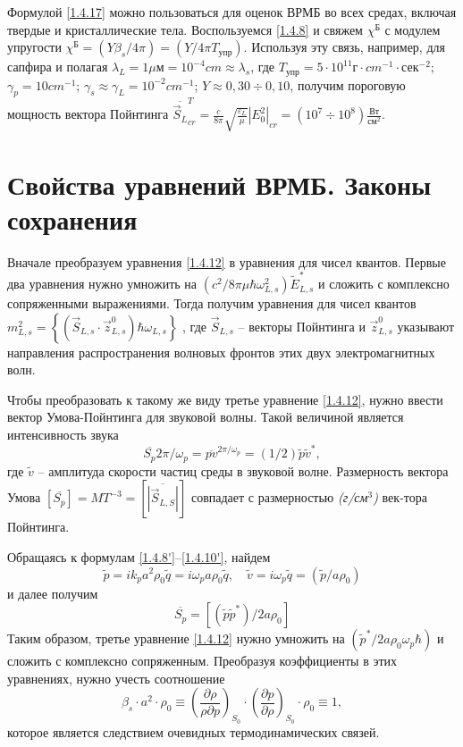 \documentclass[a4paper]{article}
\begin{document}
Формулой \eqref{1.4.17} можно пользоваться для оценок ВРМБ во всех средах, включая твердые и кристаллические тела. Воспользуемся \eqref{1.4.8} и свяжем $\chi^{\text{Б}}$ с модулем упругости $\chi^{\text{Б}}=(Y\beta_{s}/4\pi)=(Y/4\pi T_{\text{упр}})$. Используя эту связь, например, для сапфира и полагая $\lambda_{L}=1\mu\text{м}=10^{-4}cm\approx\lambda_{s}$, где $T_{\text{упр}}=5\cdot10^{11}\text{г}\cdot cm^{-1}\cdot\text{сек}^{-2}$;$\gamma_{p}=10cm^{-1}$; $\gamma_{s}\approx\gamma_{L}=10^{-2}cm^{-1}$; $Y\approx0,30\div0,10$, получим пороговую мощность вектора Пойнтинга $\overline{\vec{S}_{L}}^{T}_{cr}=\frac{c}{8\pi}\sqrt{\frac{\varepsilon_{L}}{\mu}}\left|E_{0}^{2}\right|_{cr}=(10^{7}\div10^{8})\frac{\text{Вт}}{\text{см}^{2}}$. 
\section{Свойства уравнений ВРМБ. Законы сохранения }

Вначале преобразуем уравнения \eqref{1.4.12} в уравнения для чисел квантов. Первые два уравнения нужно умножить на $(c^{2}/8\pi\mu\hbar\omega_{L,s}^{2})\tilde{E}_{L,s}^{*}$ и сложить с комплексно сопряженными выражениями. Тогда получим уравнения для чисел квантов $m_{L,s}^{2}=\left\{\left(\vec{S}_{L,s}\cdot\vec{z}_{L,s}^{0}\right)\hbar\omega_{L,s}\right\}$ , где $\vec{S}_{L,s}$ -- векторы Пойнтинга и $\vec{z}_{L,s}^{0}$ указывают направления распространения волновых фронтов этих двух электромагнитных волн. 

Чтобы преобразовать к такому же виду третье уравнение \eqref{1.4.12}, нужно ввести вектор Умова-Пойнтинга для звуковой волны. Такой величиной является интенсивность звука
\begin{equation}
	\overline{S_{p}}{2\pi/\omega_{p}}=\overline{pv}^{2\pi/\omega_{p}}=(1/2)\tilde{p}\tilde{v}^{*},
	\label{1.4.18}
\end{equation}
где  $\tilde{v}$ -- амплитуда скорости частиц среды в звуковой волне. Размерность  вектора Умова $\left[\overline{S_{p}}\right]=MT^{-3}=\left[\overline{\left|\vec{S}_{L,S}\right|}\right]$  совпадает с размерностью \textit{(г/см$^{3}$)}  век-тора Пойнтинга.

Обращаясь к формулам \eqref{1.4.8'}–\eqref{1.4.10'}, найдем 
\begin{equation}
	\tilde{p}=ik_{p}a^{2}\rho_{0}\tilde{q}=i\omega_{p}a\rho_{0}\tilde{q},\quad\tilde{v}=i\omega_{p}\tilde{q}=(\tilde{p}/a\rho_{0})
	\label{1.4.19}
\end{equation}
и далее получим 
\begin{equation}
	\overline{S_{p}}=\left[(\tilde{p}\tilde{p}^{*})/2a\rho_{0}\right]
	\label{1.4.20}
\end{equation}
Таким образом, третье уравнение \eqref{1.4.12} нужно умножить на $(\tilde{p}^{*}/2a\rho_{0}\omega_{p}\hbar)$ и сложить с комплексно сопряженным. Преобразуя коэффициенты в этих уравнениях, нужно учесть соотношение 
\begin{equation}
	\beta_{s}\cdot a^{2}\cdot\rho_{0}\equiv\left(\frac{\partial\rho}{\rho\partial p}\right)_{S_{0}}\cdot\left(\frac{\partial p}{\partial\rho}\right)_{S_{0}}\cdot\rho_{0}\equiv1,
	\label{1.4.21}
\end{equation}
которое является следствием очевидных термодинамических связей. 
\end{document}
